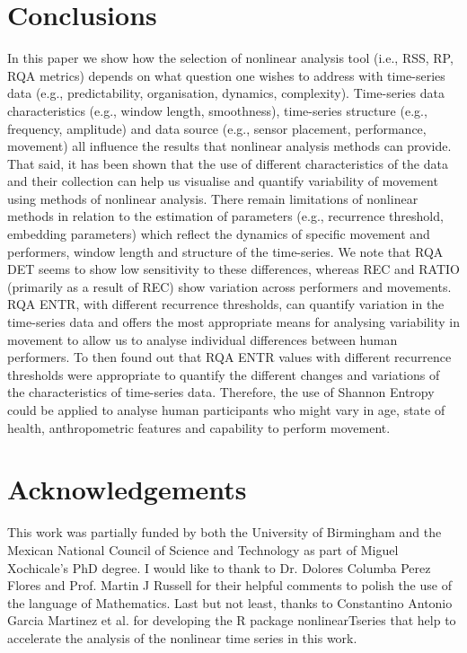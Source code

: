 \documentclass[fleqn,10pt]{wlscirep}
\begin{document}
\section*{Conclusions}
In this paper we show how the selection of nonlinear analysis tool (i.e., RSS, RP, RQA metrics) depends on what question one wishes to address with time-series data (e.g., predictability, organisation, dynamics, complexity).
Time-series data characteristics (e.g., window length, smoothness), time-series structure (e.g., frequency, amplitude) and data source (e.g., sensor placement, performance, movement) all influence the results that nonlinear analysis methods can provide.
That said, it has been shown that the use of different characteristics of the data and their collection can help us visualise and quantify variability of movement using methods of nonlinear analysis.
There remain limitations of nonlinear methods in relation to the estimation of parameters (e.g., recurrence threshold, embedding parameters) which reflect the dynamics of specific movement and performers, window length  and structure of the time-series.
We note that RQA DET seems to show low sensitivity to these differences, whereas REC and RATIO (primarily as a result of REC) show variation across performers and movements.
RQA ENTR, with different recurrence thresholds, can quantify variation in the time-series data and offers the most appropriate means for analysing variability in movement to allow us to analyse individual differences between human performers.
To then found out that RQA ENTR values with different recurrence thresholds were appropriate to quantify the different changes and variations of the characteristics of time-series data.
Therefore, the use of Shannon Entropy could be applied to analyse human participants who might vary in age, state of health, anthropometric features and capability to perform movement.




\section*{Acknowledgements}
This work was partially funded by both the University of Birmingham and the Mexican National Council of Science and Technology as part of Miguel Xochicale's PhD degree.      
I would like to thank to Dr. Dolores Columba Perez Flores and Prof. Martin J Russell for their helpful comments to polish the use of the language of Mathematics.    
Last but not least, thanks to Constantino Antonio Garcia Martinez et al. for developing the R package nonlinearTseries that help to accelerate the analysis of the nonlinear time series in this work.   
\end{document}
